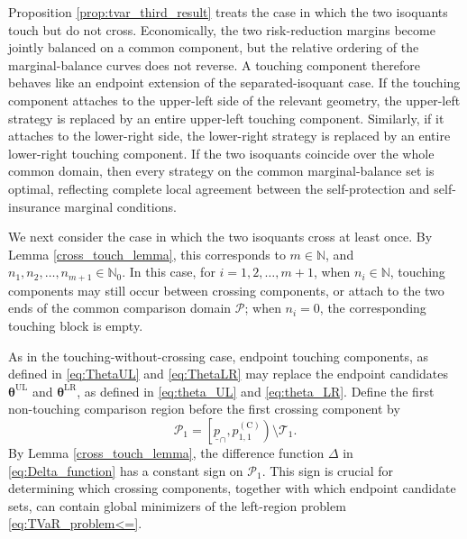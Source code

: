 \documentclass[a4paper,12pt]{article}
\begin{document}
Proposition \ref{prop:tvar_third_result} treats the case in which the two isoquants touch but do not cross. Economically, the two risk-reduction margins become jointly balanced on a common component, but the relative ordering of the marginal-balance curves does not reverse. A touching component therefore behaves like an endpoint extension of the separated-isoquant case. If the touching component attaches to the upper-left side of the relevant geometry, the upper-left strategy is replaced by an entire upper-left touching component. Similarly, if it attaches to the lower-right side, the lower-right strategy is replaced by an entire lower-right touching component. If the two isoquants coincide over the whole common domain, then every strategy on the common marginal-balance set is optimal, reflecting complete local agreement between the self-protection and self-insurance marginal conditions.

We next consider the case in which the two isoquants cross at least once. By Lemma \ref{cross_touch_lemma}, this corresponds to $m\in\mathbb{N}$, and $n_1,n_2,\dots,n_{m+1}\in\mathbb{N}_0$. In this case, for $i=1,2,\dots,m+1$, when $n_i\in\mathbb{N}$, touching components may still occur between crossing components, or attach to the two ends of the common comparison domain $\mathcal{P}$; when $n_i=0$, the corresponding touching block is empty.

As in the touching-without-crossing case, endpoint touching components, as defined in \eqref{eq:ThetaUL} and \eqref{eq:ThetaLR} may replace the endpoint candidates ${\bm\theta}^{\text{UL}}$ and ${\bm\theta}^{\text{LR}}$, as defined in \eqref{eq:theta_UL} and \eqref{eq:theta_LR}. Define the first non-touching comparison region before the first crossing component by
\begin{equation*}
\mathcal{P}_1=\left[\underline{p}_{\cap},p^{\left(\text{C}\right)}_{1,1}\right)\setminus\mathcal{T}_1.
\end{equation*}
By Lemma \ref{cross_touch_lemma}, the difference function $\Delta$ in \eqref{eq:Delta_function} has a constant sign on $\mathcal{P}_1$. This sign is crucial for determining which crossing components, together with which endpoint candidate sets, can contain global minimizers of the left-region problem \eqref{eq:TVaR_problem<=}.
\end{document}
